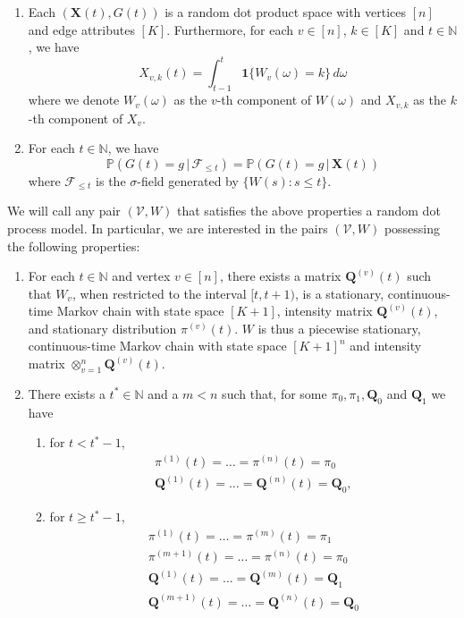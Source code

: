 \documentclass[10pt,journal,compsoc]{IEEEtran}
\theoremstyle{definition}
\begin{document}
\begin{enumerate}
\item Each $(\mathbf{X}(t), G(t))$ is a random dot product space with
  vertices $[n]$ and edge attributes $[K]$. Furthermore, for each $v
  \in [n]$, $k \in [K]$ and $t \in \mathbb{N}$, we have
  \begin{equation}
    \label{eq:54}
  X_{v,k}(t)  = \int_{t - 1}^{t}{ \mathbf{1}\{W_v(\omega) = k\}\, d\omega}
  \end{equation}
  where we denote $W_{v}(\omega)$ as the $v$-th component of $W(\omega)$ and
  $X_{v,k}$ as the $k$-th component of $X_v$.  
\item  For each $t \in \mathbb{N}$, we have
  \begin{equation}
    \label{eq:2}
    \mathbb{P}(G(t) = g \,|\, \mathscr{F}_{\leq t}) = \mathbb{P}(G(t)
    = g \,|\, \mathbf{X}(t))
  \end{equation}
where $\mathscr{F}_{\leq t}$ is the $\sigma$-field generated by $\{W(s)
  \colon s \leq t\}$.
\end{enumerate}
We will call any pair $(\mathscr{V}, W)$ that satisfies the above
properties a random dot process model. In particular, we are
interested in the pairs $(\mathscr{V}, W)$ possessing the following
properties:
\begin{enumerate}
\item For each $t \in \mathbb{N}$ and vertex $v \in [n]$, there exists
  a matrix $\mathbf{Q}^{(v)}(t)$ such that $W_v$, when restricted to
  the interval $[t, t+1)$, is a stationary, continuous-time Markov
  chain with state space $[K+1]$, intensity matrix
  ${\mathbf{Q}^{(v)}(t)}$, and stationary distribution
  $\pi^{(v)}(t)$. $W$ is thus a piecewise stationary, continuous-time
  Markov chain with state space $[K+1]^{n}$ and intensity matrix
  $\otimes_{v=1}^{n}\mathbf{Q}^{(v)}(t)$.
\item There exists a $t^{*} \in \mathbb{N}$ and a $m < n$ such that,
  for some $\pi_0, \pi_1, \mathbf{Q}_0$ and $\mathbf{Q}_1$ we have
  \begin{enumerate}
  \item for $t < t^{*} - 1$,
    \begin{gather*}
      \pi^{(1)}(t) = \dots = \pi^{(n)}(t) = \pi_0 \\
      \mathbf{Q}^{(1)}(t) = \dots = \mathbf{Q}^{(n)}(t) = \mathbf{Q}_0,
    \end{gather*}
  \item  for $t \geq t^{*} - 1$,
    \begin{gather*}
      \pi^{(1)}(t) = \dots = \pi^{(m)}(t) = \pi_1 \\
      \pi^{(m+1)}(t)  = \dots = \pi^{(n)}(t) = \pi_0 \\
      \mathbf{Q}^{(1)}(t)  = \dots = \mathbf{Q}^{(m)}(t) = \mathbf{Q}_1 \\
      \mathbf{Q}^{(m+1)}(t) = \dots = \mathbf{Q}^{(n)}(t) = \mathbf{Q}_0 
    \end{gather*}
  \end{enumerate}
\end{enumerate}
\end{document}
